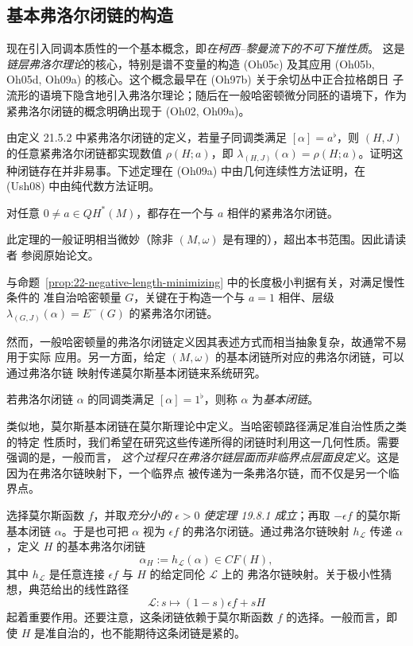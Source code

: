 \subsection{基本弗洛尔闭链的构造}

现在引入同调本质性的一个基本概念，即\emph{在柯西--黎曼流下的不可下推性质}。
这是\emph{链层弗洛尔理论}的核心，特别是谱不变量的构造 (Oh05c) 及其应用
(Oh05b, Oh05d, Oh09a) 的核心。这个概念最早在 (Oh97b) 关于余切丛中正合拉格朗日
子流形的语境下隐含地引入弗洛尔理论；随后在一般哈密顿微分同胚的语境下，作为
紧弗洛尔闭链的概念明确出现于 (Oh02, Oh09a)。

由定义 21.5.2 中紧弗洛尔闭链的定义，若量子同调类满足 $[\alpha]=a^\flat$，则
$(H,J)$ 的任意紧弗洛尔闭链都实现数值 $\rho(H;a)$，即
$\lambda_{(H,J)}(\alpha)=\rho(H;a)$。证明这种闭链存在并非易事。下述定理在 (Oh09a)
中由几何连续性方法证明，在 (Ush08) 中由纯代数方法证明。

\begin{theorem}
\label{thm:22-tight-floer-cycle-exists}
对任意 $0\neq a\in QH^*(M)$，都存在一个与 $a$ 相伴的紧弗洛尔闭链。
\end{theorem}

此定理的一般证明相当微妙（除非 $(M,\omega)$ 是有理的），超出本书范围。因此请读者
参阅原始论文。

与命题~\ref{prop:22-negative-length-minimizing} 中的长度极小判据有关，对满足慢性条件的
准自治哈密顿量 $G$，关键在于构造一个与 $a=1$ 相伴、层级
$\lambda_{(G,J)}(\alpha)=E^-(G)$ 的紧弗洛尔闭链。

然而，一般哈密顿量的弗洛尔闭链定义因其表述方式而相当抽象复杂，故通常不易用于实际
应用。另一方面，给定 $(M,\omega)$ 的基本闭链所对应的弗洛尔闭链，可以通过弗洛尔链
映射传递莫尔斯基本闭链来系统研究。

\begin{definition}
\label{def:22-fundamental-floer-cycle}
若弗洛尔闭链 $\alpha$ 的同调类满足 $[\alpha]=1^\flat$，则称 $\alpha$ 为\emph{基本闭链}。
\end{definition}

类似地，莫尔斯基本闭链在莫尔斯理论中定义。当哈密顿路径满足准自治性质之类的特定
性质时，我们希望在研究这些传递所得的闭链时利用这一几何性质。需要强调的是，一般而言，
\emph{这个过程只在弗洛尔链层面而非临界点层面良定义}。这是因为在弗洛尔链映射下，一个临界点
被传递为一条弗洛尔链，而不仅是另一个临界点。

选择莫尔斯函数 $f$，并取\emph{充分小的} $\epsilon>0$ \emph{使定理 19.8.1 成立}；再取
$-\epsilon f$ 的莫尔斯基本闭链 $\alpha$。于是也可把 $\alpha$ 视为
$\epsilon f$ 的弗洛尔闭链。通过弗洛尔链映射 $h_{\mathcal L}$ 传递 $\alpha$，定义
$H$ 的基本弗洛尔闭链
\[
 \alpha_H:=h_{\mathcal L}(\alpha)\in CF(H),
\]
其中 $h_{\mathcal L}$ 是任意连接 $\epsilon f$ 与 $H$ 的给定同伦 $\mathcal L$ 上的
弗洛尔链映射。关于极小性猜想，典范给出的线性路径
\[
 \mathcal L:s\longmapsto(1-s)\epsilon f+sH
\]
起着重要作用。还要注意，这条闭链依赖于莫尔斯函数 $f$ 的选择。一般而言，即使 $H$
是准自治的，也不能期待这条闭链是紧的。

